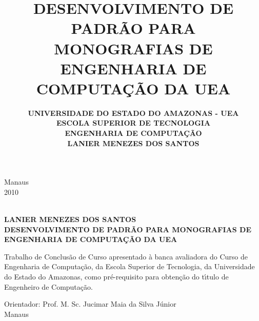 \documentclass{dcctese}
\begin{document}


\thispagestyle{empty}



\title{ \textbf{DESENVOLVIMENTO DE PADR\~{A}O PARA MONOGRAFIAS DE ENGENHARIA DE COMPUTA\c{C}\~{A}O DA UEA}}

\author{ \bf UNIVERSIDADE DO ESTADO DO AMAZONAS - UEA \\[12pt] \bf ESCOLA SUPERIOR DE TECNOLOGIA \\[12pt] \bf ENGENHARIA DE COMPUTA\c{C}\~{A}O \\
	[96pt] \bf LANIER MENEZES DOS SANTOS}

\maketitle

\begin{center}
\large Manaus\\
\large 2010
\end{center}

\newpage


\thispagestyle{empty}
\begin{center}
\textbf{\\[4em]LANIER MENEZES DOS SANTOS \\[5cm]}
\textbf{DESENVOLVIMENTO DE PADR\~{A}O PARA MONOGRAFIAS DE ENGENHARIA DE COMPUTA\c{C}\~{A}O DA UEA\\[96pt]}

\end{center}

\hspace*{8cm}
\begin{minipage}{8cm} 
Trabalho de Conclus\~{a}o de Curso
apresentado \`{a} banca avaliadora do Curso de Engenharia de Computa\c{c}\~{a}o, da 
Escola Superior de Tecnologia, da Universidade do Estado do Amazonas, como
pr\'e-requisito para obten\c{c}\~{a}o do t\'{\i}tulo de Engenheiro de Computa\c{c}\~{a}o.\\[50pt] 
\end{minipage} 

\begin{center}
Orientador: Prof. M. Sc. Jucimar Maia da Silva J\'{u}nior\\[4ex]
\normal Manaus\\
\end{center}
\end{document}
